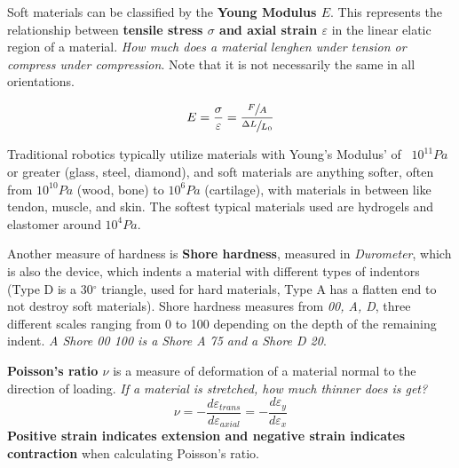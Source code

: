 \documentclass[onecolumn,a4paper]{article}
\begin{document}
Soft materials can be classified by the \textbf{Young Modulus $E$}. This represents the relationship between \textbf{tensile stress $\sigma$ and axial strain $\varepsilon$} in the linear elatic region of a material. \emph{How much does a material lenghen under tension or compress under compression}. Note that it is not necessarily the same in all orientations.

\begin{equation}
E=\frac{\sigma}{\varepsilon}=\frac{\sfrac{F}{A}}{\sfrac{\Delta L}{L_0}}
\end{equation}

Traditional robotics typically utilize materials with Young's Modulus' of ~$10^{11} Pa$ or greater (glass, steel, diamond), and soft materials are anything softer, often from $10^{10} Pa$ (wood, bone) to $10^{6} Pa$ (cartilage), with materials in between like tendon, muscle, and skin. The softest typical materials used are hydrogels and elastomer around $10^4 Pa$.

Another measure of hardness is \textbf{Shore hardness}, measured in \emph{Durometer}, which is also the device, which indents a material with different types of indentors (Type D is a 30$^\circ$ triangle, used for hard materials, Type A has a flatten end to not destroy soft materials). Shore hardness measures from \emph{00, A, D}, three different scales ranging from 0 to 100 depending on the depth of the remaining indent. \emph{A Shore 00 100 is a Shore A 75 and a Shore D 20}.

\textbf{Poisson's ratio $\nu$} is a measure of deformation of a material normal to the direction of loading. \emph{If a material is stretched, how much thinner does is get?} 
\begin{equation}
    \nu = -\frac{d\varepsilon _{trans}}{d\varepsilon _{axial}}= - \frac{d\varepsilon_y}{d\varepsilon_x}
\end{equation}
\textbf{Positive strain indicates extension and negative strain indicates contraction} when calculating Poisson's ratio.
\end{document}
